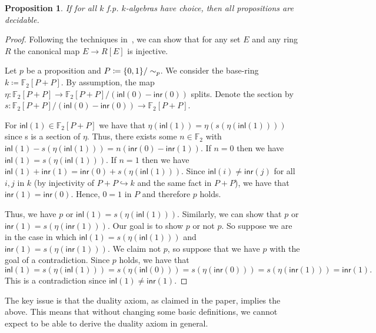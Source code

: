 \documentclass[10pt,a4paper]{article}
\newtheorem{proposition}{Proposition}[section]
\newcommand\inl{\mathsf{inl}}
\newcommand\inr{\mathsf{inr}}
\DeclarePairedDelimiter\set{\{}{\}}
\begin{document}
\begin{proposition}
  If for all \(k\) f.p. \(k\)-algebras have choice, then all propositions are decidable.
\end{proposition}
\begin{proof}
  Following the techniques in~\cite{mines}, we can show that for any set $E$ and any ring $R$ the canonical map $E \to R[E]$ is injective.

  Let $p$ be a proposition and $P \coloneqq \set{0,1} / \sim_p$.
  We consider the base-ring $k \coloneqq \mathbb{F}_2[P + P]$.
  By assumption, the map $\eta \colon \mathbb{F}_2[P + P] \to \mathbb{F}_2[P + P] / (\inl(0) - \inr(0))$ splits.
  Denote the section by $s : \mathbb{F}_2[P + P] / (\inl(0) - \inr(0)) \to \mathbb{F}_2[P + P]$.

  For $\inl(1) \in \mathbb{F}_2[P + P]$ we have that $\eta(\inl(1)) = \eta(s(\eta(\inl(1))))$ since s is a section of $\eta$.
  Thus, there exists some $n \in \mathbb{F}_2$ with $\inl(1) - s(\eta(\inl(1))) = n(\inr(0) - \inr(1))$.
  If $n = 0$ then we have $\inl(1) = s(\eta(\inl(1)))$.
  If $n = 1$ then we have $\inl(1) + \inr(1) = \inr(0) + s(\eta(\inl(1)))$.
  Since $\inl(i) \ne \inr(j)$ for all $i, j$ in $k$ (by injectivity of $P + P \hookrightarrow k$ and the same fact in $P + P$), we have that $\inr(1) = \inr(0)$.
  Hence, $0 = 1$ in $P$ and therefore $p$ holds.

  Thus, we have $p$ or $\inl(1) = s(\eta(\inl(1)))$.
  Similarly, we can show that $p$ or $\inr(1) = s(\eta(\inr(1)))$.
  Our goal is to show $p$ or not $p$.
  So suppose we are in the case in which $\inl(1) = s(\eta(\inl(1)))$ and $\inr(1) = s(\eta(\inr(1)))$.
  We claim not $p$, so suppose that we have $p$ with the goal of a contradiction.
  Since $p$ holds, we have that
  \[
    \inl(1) = s(\eta(\inl(1))) = s(\eta(\inl(0))) = s(\eta(\inr(0))) = s(\eta(\inr(1))) = \inr(1).
  \]
  This is a contradiction since $\inl(1) \ne \inr(1)$.
\end{proof}

The key issue is that the duality axiom, as claimed in the paper, implies the above.
This means that without changing some basic definitions, we cannot expect to be able to derive the duality axiom in general.
\end{document}
